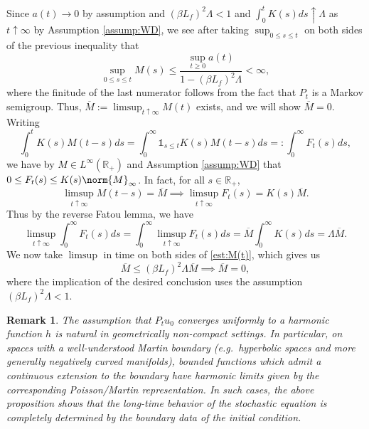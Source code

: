 \documentclass{article}
\newtheorem{remark}[theorem]{Remark}
\numberwithin{theorem}{section}
\def\RR{\mathbb{R}} %
\begin{document}
Since $a(t)\to 0$ by assumption and $(\beta L_f)^2 \Lambda < 1$ and $\int_0^tK(s)ds\uparrow \Lambda$ as $t\uparrow\infty$ by Assumption \ref{assump:WD}, we see after taking $\sup_{0\le s\le t}$ on both sides of the previous inequality that
\[
\sup_{0\le s\le t} M(s) \le \frac{\sup_{t\ge 0}a(t)}{1-(\beta L_f)^2 \Lambda}<\infty ,
\] where the finitude of the last numerator follows from the fact that $P_t$ is a Markov semigroup.
Thus, \(\overline{M}:=\limsup_{t\uparrow\infty}M(t)\) exists, and we will show \(\overline{M}=0\). Writing \[\int_0^t K(s)M(t-s)ds=\int_0^\infty \mathbb{1}_{s\leq t}K(s)M(t-s) ds=:\int_0^\infty F_t(s)ds,\]
we have by $M\in L^\infty(\RR_+)$ and Assumption \ref{assump:WD} that \(0\leq F_t(s)\leq K(s)\norm{M}_{\infty}\). In fact, for all $s\in \RR_+$, \[\limsup_{t\uparrow\infty}M(t-s)=\overline{M}\implies \limsup_{t\uparrow\infty}F_t(s)=K(s)\overline{M}.\]
Thus by the reverse Fatou lemma, we have \[\limsup_{t\uparrow\infty}\int_0^\infty F_t(s)ds=\int_0^\infty \limsup_{t\uparrow\infty}F_t(s)ds=\overline{M}\int_0^\infty K(s)ds=\Lambda \overline{M}.\]
We now take $\limsup$ in time on both sides of \eqref{est:M(t)}, which gives us \[\overline{M}\leq (\beta L_f)^2\Lambda\overline{M}\implies\overline{M}=0,\] where the implication of the desired conclusion uses the assumption $(\beta L_f)^2\Lambda<1$.

\begin{remark}
The assumption that $P_t u_0$ converges uniformly to a harmonic function $h$ is natural in geometrically non-compact settings. In particular, on spaces with a well-understood Martin boundary (e.g.\ hyperbolic spaces and more generally negatively curved manifolds), bounded functions which admit a continuous extension to the boundary have harmonic limits given by the corresponding Poisson/Martin representation. In such cases, the above proposition shows that the long-time behavior of the stochastic equation is completely determined by the boundary data of the initial condition.
\end{remark}

\printbibliography
\end{document}
